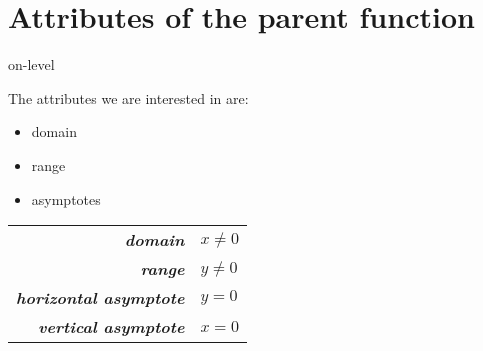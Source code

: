 \section{Attributes of the parent function}

\begin{taggedblock}{on-level}
\begin{minipage}{0.4\textwidth}
    The attributes we are interested in are:
    \vspace{1em}
    \begin{itemize}[nosep]
        \item domain
        \item range
        \item asymptotes
    \end{itemize}
\end{minipage}
\begin{minipage}{0.59\textwidth}
    \begin{myCenteredBox}[width=3.75in,]
        \begin{center}
            {
            \Large
            \begin{tabular}{r|l}
                {\bfseries\itshape domain}     & $x \neq 0 $ \\
                {\bfseries\itshape range}      & $y \neq 0 $ \\
                {\bfseries\itshape horizontal asymptote} & $ y = 0$  \\
                {\bfseries\itshape vertical asymptote} & $ x = 0$  \\
            \end{tabular}
            }
        \end{center}
    \end{myCenteredBox}
\end{minipage}
\end{taggedblock}



